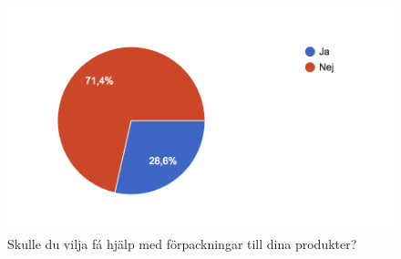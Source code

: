 \documentclass[10pt,a4paper,oneside]{article}
\begin{document}
\begin{figure}
	\includegraphics[scale=0.6]{14.png}
	\caption{Skulle du vilja f\'a hj\"alp med f\"orpackningar till dina produkter?}
\end{figure}
\end{document}
